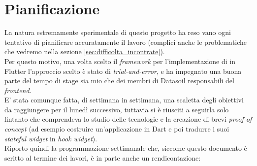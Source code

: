 \section{Pianificazione}
\label{sec:pianificazione}
La natura estremamente sperimentale di questo progetto ha reso vano ogni tentativo di pianificare accuratamente il lavoro (complici anche le problematiche che vedremo nella sezione \ref{sec:difficolta_incontrate}).\\
Per questo motivo, una volta scelto il \textit{framework} per l'implementazione di \asa{} in Flutter l'approccio scelto è stato di \textit{trial-and-error}, e ha impegnato una buona parte del tempo di stage sia mio che dei membri di Datasoil responsabili del \textit{frontend}.\\
E' stata comunque fatta, di settimana in settimana, una scaletta degli obiettivi da raggiungere per il lunedì successivo, tuttavia si è riusciti a seguirla solo fintanto che comprendeva lo studio delle tecnologie e la creazione di brevi \textit{proof of concept} (ad esempio costruire un'applicazione in Dart e poi tradurre i suoi \textit{stateful widget} in \textit{hook widget}).\\
Riporto quindi la programmazione settimanale che, siccome questo documento è scritto al termine dei lavori, è in parte anche un rendicontazione:

